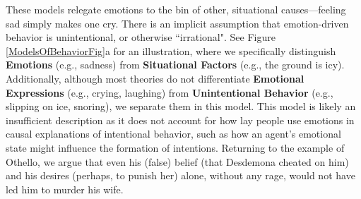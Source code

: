 \documentclass[10pt,letterpaper]{article}
\begin{document}

These models relegate emotions to the bin of other, situational causes---feeling sad simply makes one cry.
There is an implicit assumption that emotion-driven behavior is unintentional, or otherwise ``irrational". 
See Figure \ref{ModelsOfBehaviorFig}a for an illustration, where we specifically distinguish \textbf{Emotions} (e.g., sadness) from \textbf{Situational Factors} (e.g., the ground is icy). 
Additionally, although most theories do not differentiate \textbf{Emotional Expressions} (e.g., crying, laughing) from \textbf{Unintentional Behavior} (e.g., slipping on ice, snoring), we separate them in this model. 
This model is likely an insufficient description as it does not account for how lay people use emotions in causal explanations of intentional behavior, such as how an agent's emotional state might influence the formation of intentions. Returning to the example of Othello, we argue that even his (false) belief (that Desdemona cheated on him) and his desires (perhaps, to punish her) alone, without any rage, would not have led him to murder his wife. 
\end{document}
